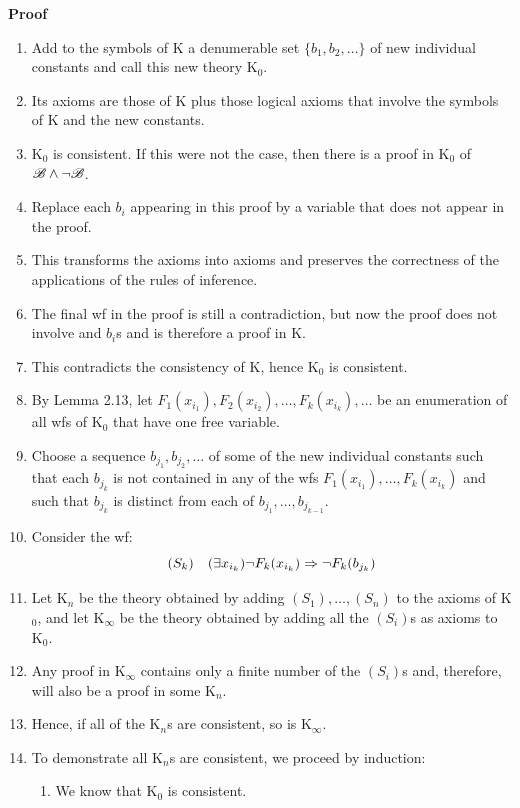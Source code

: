 \textbf{Proof}
\begin{enumerate}
    \item Add to the symbols of K a denumerable set $\{b_1, b_2, \dots \}$ of new individual constants and call this new theory K$_0$.
    \item Its axioms are those of K plus those logical axioms that involve the symbols of K and the new constants.
    \item K$_0$ is consistent. If this were not the case, then there is a proof in K$_0$ of $\mathscr{B} \land \lnot \mathscr{B}$.
    \item Replace each $b_i$ appearing in this proof by a variable that does not appear in the proof.
    \item This transforms the axioms into axioms and preserves the correctness of the applications of the rules of inference.
    \item The final wf in the proof is still a contradiction, but now the proof does not involve and $b_i$s and is therefore a proof in K.
    \item This contradicts the consistency of K, hence K$_0$ is consistent.
    \item By Lemma 2.13, let $F_1(x_{i_1}), F_2(x_{i_2}), \dots, F_k(x_{i_k}), \dots$ be an enumeration of all wfs of K$_0$ that have one free variable.
    \item Choose a sequence $b_{j_1}, b_{j_2}, \dots$ of some of the new individual constants such that each $b_{j_k}$ is not contained in any of the wfs $F_1(x_{i_1}), \dots, F_k(x_{i_k})$ and such that $b_{j_k}$ is distinct from each of $b_{j_1}, \dots ,b_{j_{k-1}}$.
    \item Consider the wf:
    \[(S_k) \quad (\exists x_{i_k}) \lnot F_k(x_{i_k}) \Rightarrow \lnot F_k(b_{j_k})\]
    \item Let K$_n$ be the theory obtained by adding $(S_1), \dots, (S_n)$ to the axioms of K$_0$, and let K$_\infty$ be the theory obtained by adding all the $(S_i)$s as axioms to K$_0$.
    \item Any proof in K$_\infty$ contains only a finite number of the $(S_i)$s and, therefore, will also be a proof in some K$_n$.
    \item Hence, if all of the K$_n$s are consistent, so is K$_\infty$.
    \item To demonstrate all K$_n$s are consistent, we proceed by induction:
    \begin{enumerate} [label = \roman*.]
        \item We know that K$_0$ is consistent.

\end{enumerate}
\end{enumerate}
